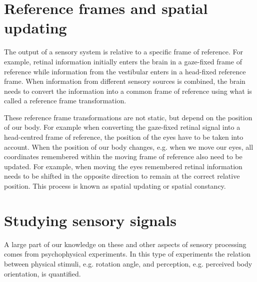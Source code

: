 



\section{Reference frames and spatial updating}
The output of a sensory system is relative to a specific frame of reference. For example, retinal information initially enters the brain in a gaze-fixed frame of reference while information from the vestibular enters in a head-fixed reference frame. When information from different sensory sources is combined, the brain needs to convert the information into a common frame of reference using what is called a reference frame transformation.

These reference frame transformations are not static, but depend on the position of our body. For example when converting the gaze-fixed retinal signal into a head-centred frame of reference, the position of the eyes have to be taken into account. When the position of our body changes, e.g. when we move our eyes, all coordinates remembered within the moving frame of reference also need to be updated. For example, when moving the eyes remembered retinal information needs to be shifted in the opposite direction to remain at the correct relative position. This process is known as spatial updating or spatial constancy.

\section{Studying sensory signals}
A large part of  our knowledge on these and other aspects of sensory processing comes from psychophysical experiments. In this type of experiments the relation between physical stimuli, e.g. rotation angle, and perception, e.g. perceived body orientation, is quantified.

